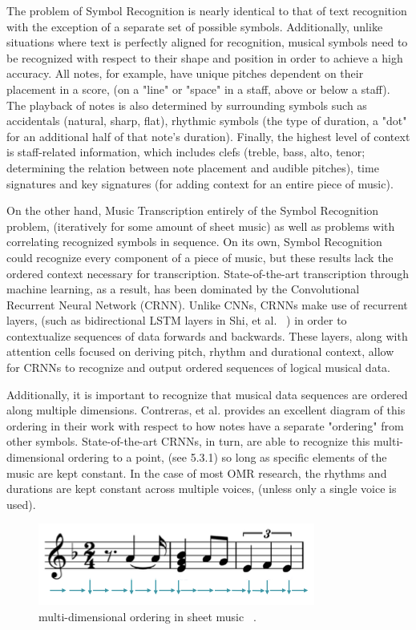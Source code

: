 \documentclass[nonacm, sigconf]{acmart}
\begin{document}
The problem of Symbol Recognition is nearly identical to that of text recognition with the exception of a separate set of possible symbols.
Additionally, unlike situations where text is perfectly aligned for recognition, musical symbols need to be recognized with respect to their shape and position in order to achieve a high accuracy.
All notes, for example, have unique pitches dependent on their placement in a score, (on a "line" or "space" in a staff, above or below a staff).
The playback of notes is also determined by surrounding symbols such as accidentals (natural, sharp, flat), rhythmic symbols (the type of duration, a "dot" for an additional half of that note's duration).
Finally, the highest level of context is staff-related information, which includes clefs (treble, bass, alto, tenor; determining the relation between note placement and audible pitches), time signatures and key signatures (for adding context for an entire piece of music).

On the other hand, Music Transcription entirely of the Symbol Recognition problem, (iteratively for some amount of sheet music) as well as problems with correlating recognized symbols in sequence.
On its own, Symbol Recognition could recognize every component of a piece of music, but these results lack the ordered context necessary for transcription.
State-of-the-art transcription through machine learning, as a result, has been dominated by the Convolutional Recurrent Neural Network (CRNN). 
Unlike CNNs, CRNNs make use of recurrent layers, (such as bidirectional LSTM layers in Shi, et al. ~\cite{shi2015endtoend}) in order to contextualize sequences of data forwards and backwards.
These layers, along with attention cells focused on deriving pitch, rhythm and durational context, allow for CRNNs to recognize and output ordered sequences of logical musical data.

Additionally, it is important to recognize that musical data sequences are ordered along multiple dimensions.
Contreras, et al. provides an excellent diagram of this ordering in their work with respect to how notes have a separate "ordering" from other symbols.
State-of-the-art CRNNs, in turn, are able to recognize this multi-dimensional ordering to a point, (see 5.3.1) so long as specific elements of the music are kept constant.
In the case of most OMR research, the rhythms and durations are kept constant across multiple voices, (unless only a single voice is used).

\begin{figure}
	\centering
	\includegraphics[width = .8\linewidth]{./figures/ordering.png}
	\caption{multi-dimensional ordering in sheet music ~\cite{contreras2023omrcnn}.}
	\label{fig:ordering}
\end{figure}
\end{document}
